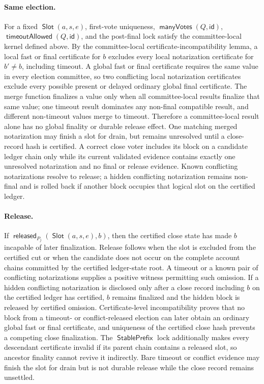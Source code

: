 \documentclass[sigplan,twocolumn,review,anonymous]{acmart}
\newcommand{\func}[1]{\operatorname{\mathsf{#1}}}
\newcommand{\manyVotes}{\func{manyVotes}}
\newcommand{\id}{\mathsf{id}}
\newcommand{\Slot}{\func{Slot}}
\newcommand{\timeoutAllowed}{\func{timeoutAllowed}}
\newcommand{\released}{\func{released}}
\newcommand{\StablePrefix}{\func{StablePrefix}}
\begin{document}
\paragraph{Same election.}
For a fixed \(\Slot(a,s,e)\), first-vote uniqueness, \(\manyVotes(Q,\id)\),
\(\timeoutAllowed(Q,\id)\), and the post-final lock satisfy the committee-local kernel defined above.
By the committee-local certificate-incompatibility lemma, a local fast or final certificate for \(b\)
excludes every
local notarization certificate for \(b'\neq b\), including timeout.  A global fast or final certificate
requires the same value in every election committee, so two conflicting local notarization
certificates exclude every possible present or delayed ordinary global final certificate.  The merge
function finalizes a value only when all committee-local results finalize that same value; one timeout
result dominates any non-final compatible result, and different non-timeout values merge to timeout.
Therefore a committee-local result alone has no global finality or durable release effect.  One
matching merged notarization may finish a slot for drain, but remains unresolved until a close-record
hash is certified.  A correct close voter includes its block on a candidate ledger chain only while its
current validated evidence contains exactly one unresolved notarization and no final or release
evidence.  Known conflicting notarizations resolve to release; a hidden conflicting notarization
remains non-final and is rolled back if another block occupies that logical slot on the certified
ledger.

\paragraph{Release.}
If \(\released_{P_j}(\Slot(a,s,e),b)\), then the certified close state has made \(b\) incapable of
later finalization.  Release follows when the slot is excluded from the certified cut or when the candidate does not occur
on the complete account chains committed by the certified ledger-state root.  A timeout or a known pair
of conflicting notarizations supplies a positive witness permitting such omission.  If a hidden
conflicting notarization is disclosed only after a close record including \(b\) on the certified
ledger has certified, \(b\) remains finalized and the hidden block is released by certified omission.
Certificate-level incompatibility proves that no block from
a timeout- or conflict-released election can later obtain an ordinary global fast or final certificate,
and uniqueness of the certified close hash prevents a competing close finalization.  The
\(\StablePrefix\) lock additionally makes every descendant certificate invalid if its parent chain
contains a released slot, so ancestor finality cannot revive it indirectly.  Bare timeout or conflict
evidence may finish the slot for drain but is not durable release while the close record remains
unsettled.
\end{document}
